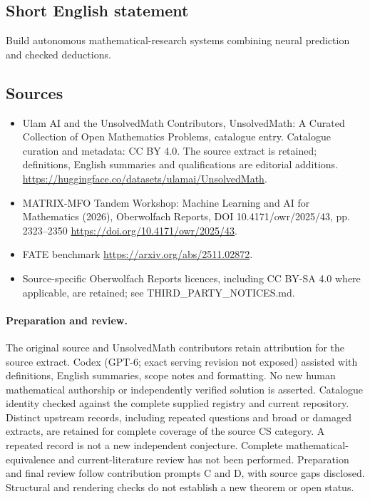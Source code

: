 \documentclass[11pt]{article}
\begin{document}
\subsection{Short English statement}
Build autonomous mathematical-research systems combining neural prediction and checked deductions.
\subsection{Sources}
\begin{itemize}
\item[\hypertarget{source:statement:1}{S1}] Ulam AI and the UnsolvedMath Contributors, UnsolvedMath: A Curated Collection of Open Mathematics Problems, catalogue entry. Catalogue curation and metadata: CC BY 4.0. The source extract is retained; definitions, English summaries and qualifications are editorial additions.
\url{https://huggingface.co/datasets/ulamai/UnsolvedMath}.
\item[\hypertarget{source:statement:2}{S2}] MATRIX-MFO Tandem Workshop: Machine Learning and AI for Mathematics (2026), Oberwolfach Reports, DOI 10.4171/owr/2025/43, pp. 2323--2350
\url{https://doi.org/10.4171/owr/2025/43}.
\item[\hypertarget{source:statement:3}{S3}] FATE benchmark
\url{https://arxiv.org/abs/2511.02872}.
\item Source-specific Oberwolfach Reports licences, including CC BY-SA 4.0 where applicable, are retained; see THIRD\_PARTY\_NOTICES.md.
\end{itemize}
\paragraph{Preparation and review.}
The original source and UnsolvedMath contributors retain attribution for the source extract. Codex (GPT-6; exact serving revision not exposed) assisted with definitions, English summaries, scope notes and formatting. No new human mathematical authorship or independently verified solution is asserted. Catalogue identity checked against the complete supplied registry and current repository. Distinct upstream records, including repeated questions and broad or damaged extracts, are retained for complete coverage of the source CS category. A repeated record is not a new independent conjecture. Complete mathematical-equivalence and current-literature review has not been performed. Preparation and final review follow contribution prompts C and D, with source gaps disclosed. Structural and rendering checks do not establish a new theorem or open status.
\label{end:statement}
\end{document}
